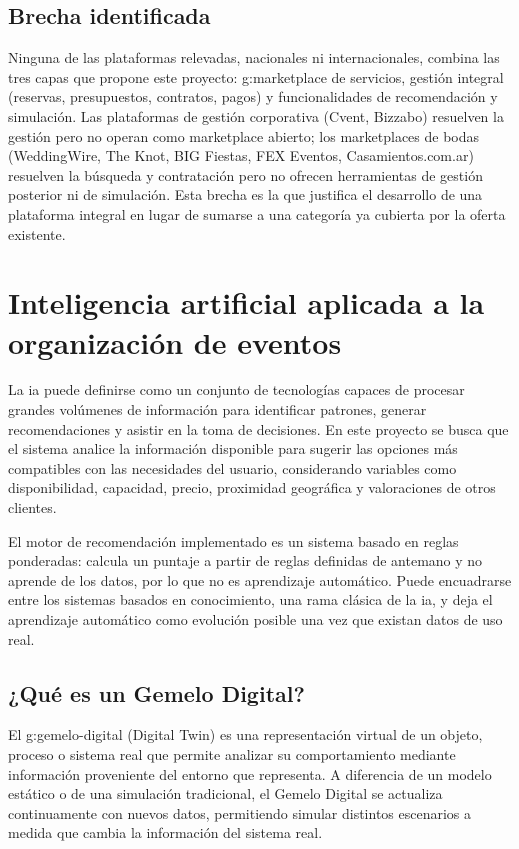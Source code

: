 \subsection{Brecha identificada}

Ninguna de las plataformas relevadas, nacionales ni internacionales,
combina las tres capas que propone este proyecto: \gls{g:marketplace} de
servicios, gestión integral (reservas, presupuestos, contratos, pagos) y
funcionalidades de recomendación y simulación. Las
plataformas de gestión corporativa (Cvent, Bizzabo) resuelven la gestión
pero no operan como marketplace abierto; los marketplaces de bodas
(WeddingWire, The Knot, BIG Fiestas, FEX Eventos, Casamientos.com.ar)
resuelven la búsqueda y contratación pero no ofrecen herramientas de
gestión posterior ni de simulación. Esta brecha es la que justifica el
desarrollo de una plataforma integral en lugar de sumarse a una categoría
ya cubierta por la oferta existente.

\section{Inteligencia artificial aplicada a la organización de eventos}

La \gls{ia} puede definirse como un conjunto de tecnologías capaces de
procesar grandes volúmenes de información para identificar patrones,
generar recomendaciones y asistir en la toma de decisiones. En este
proyecto se busca que el sistema analice la información disponible para
sugerir las opciones más compatibles con las necesidades del usuario,
considerando variables como disponibilidad, capacidad, precio, proximidad
geográfica y valoraciones de otros clientes.

El motor de recomendación implementado es un sistema basado en reglas
ponderadas: calcula un puntaje a partir de reglas definidas de antemano
y no aprende de los datos, por lo que no es aprendizaje automático.
Puede encuadrarse entre los sistemas basados en conocimiento, una rama
clásica de la \gls{ia}, y deja el aprendizaje automático como evolución
posible una vez que existan datos de uso real.

\subsection{¿Qué es un Gemelo Digital?}

El \gls{g:gemelo-digital} (Digital Twin) es una representación virtual de
un objeto, proceso o sistema real que permite analizar su comportamiento
mediante información proveniente del entorno que representa. A diferencia
de un modelo estático o de una simulación tradicional, el Gemelo Digital
se actualiza continuamente con nuevos datos, permitiendo simular
distintos escenarios a medida que cambia la información del sistema real.

